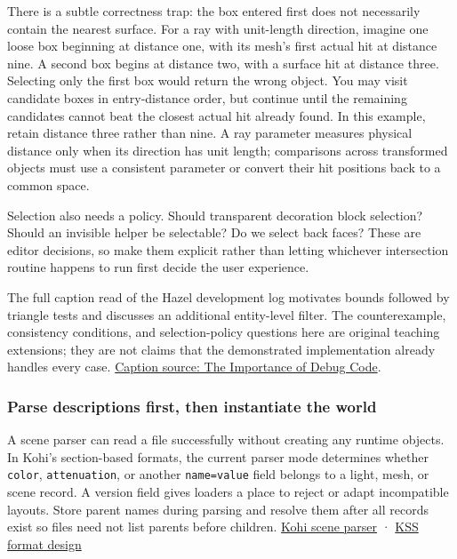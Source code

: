 There is a subtle correctness trap: the box entered first does not necessarily contain the nearest surface. For a ray with unit-length direction, imagine one loose box beginning at distance one, with its mesh's first actual hit at distance nine. A second box begins at distance two, with a surface hit at distance three. Selecting only the first box would return the wrong object. You may visit candidate boxes in entry-distance order, but continue until the remaining candidates cannot beat the closest actual hit already found. In this example, retain distance three rather than nine. A ray parameter measures physical distance only when its direction has unit length; comparisons across transformed objects must use a consistent parameter or convert their hit positions back to a common space.

Selection also needs a policy. Should transparent decoration block selection? Should an invisible helper be selectable? Do we select back faces? These are editor decisions, so make them explicit rather than letting whichever intersection routine happens to run first decide the user experience.

The full caption read of the Hazel development log motivates bounds followed by triangle tests and discusses an additional entity-level filter. The counterexample, consistency conditions, and selection-policy questions here are original teaching extensions; they are not claims that the demonstrated implementation already handles every case. \href{https://www.youtube.com/watch?v=mdJtdKA6H4s}{Caption source: The Importance of Debug Code}.

\subsubsection{Parse descriptions first, then instantiate the world}\label{06-engine-ii-ch032-parse-descriptions-first-then-instantiate-the-world}

\hypertarget{06-engine-ii-ch032-parse-descriptions-first-then-instantiate-the-world}{}

A scene parser can read a file successfully without creating any runtime objects. In Kohi's section-based formats, the current parser mode determines whether \texttt{color}, \texttt{attenuation}, or another \texttt{name=value} field belongs to a light, mesh, or scene record. A version field gives loaders a place to reject or adapt incompatible layouts. Store parent names during parsing and resolve them after all records exist so files need not list parents before children. \href{https://www.youtube.com/watch?v=q8AfndGO-Ms}{Kohi scene parser} · \href{https://www.youtube.com/watch?v=tjQWdtn9FgY}{KSS format design}

